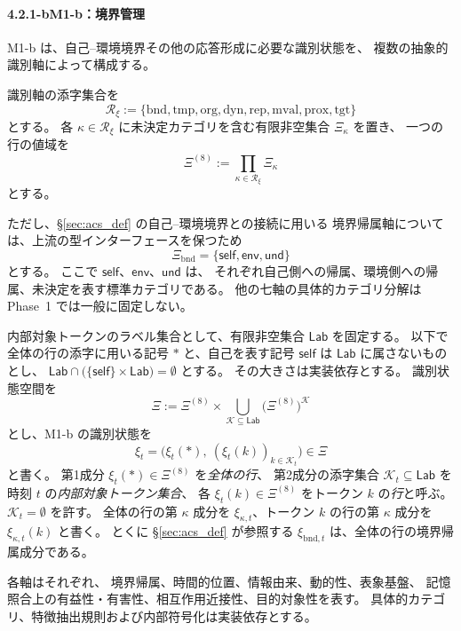 \paragraph*{4.2.1-b\quad M1-b：境界管理}

M1-b は、自己--環境境界その他の応答形成に必要な識別状態を、
複数の抽象的識別軸によって構成する。

\begin{definition}
\label{def:id_vector}
識別軸の添字集合を
\[
  \mathcal R_\xi
  :=
  \{
    \mathrm{bnd},
    \mathrm{tmp},
    \mathrm{org},
    \mathrm{dyn},
    \mathrm{rep},
    \mathrm{mval},
    \mathrm{prox},
    \mathrm{tgt}
  \}
\]
とする。
各 $\kappa\in\mathcal R_\xi$ に未決定カテゴリを含む有限非空集合 $\Xi_\kappa$ を置き、
一つの行の値域を
\[
  \Xi^{(8)}:=\prod_{\kappa\in\mathcal R_\xi}\Xi_\kappa
\]
とする。

ただし、\S\ref{sec:acs_def} の自己--環境境界との接続に用いる
境界帰属軸については、上流の型インターフェースを保つため
\[
  \Xi_{\mathrm{bnd}}
  =
  \{\mathsf{self},\mathsf{env},\mathsf{und}\}
\]
とする。
ここで $\mathsf{self}$、$\mathsf{env}$、$\mathsf{und}$ は、
それぞれ自己側への帰属、環境側への帰属、未決定を表す標準カテゴリである。
他の七軸の具体的カテゴリ分解は Phase~1 では一般に固定しない。

内部対象トークンのラベル集合として、有限非空集合 $\mathsf{Lab}$ を固定する。
以下で全体の行の添字に用いる記号 $\ast$ と、自己を表す記号 $\mathsf{self}$ は $\mathsf{Lab}$ に属さないものとし、
$\mathsf{Lab}\cap\bigl(\{\mathsf{self}\}\times\mathsf{Lab}\bigr)=\emptyset$ とする。
その大きさは実装依存とする。
識別状態空間を
\[
  \Xi
  :=
  \Xi^{(8)}
  \times
  \bigcup_{\mathcal K\subseteq\mathsf{Lab}}
  \bigl(\Xi^{(8)}\bigr)^{\mathcal K}
\]
とし、M1-b の識別状態を
\[
  \xi_t
  =
  \bigl(
    \xi_t(\ast),\
    (\xi_t(k))_{k\in\mathcal K_t}
  \bigr)
  \in\Xi
\]
と書く。
第1成分 $\xi_t(\ast)\in\Xi^{(8)}$ を\emph{全体の行}、
第2成分の添字集合 $\mathcal K_t\subseteq\mathsf{Lab}$ を時刻 $t$ の\emph{内部対象トークン集合}、
各 $\xi_t(k)\in\Xi^{(8)}$ をトークン $k$ の\emph{行}と呼ぶ。
$\mathcal K_t=\emptyset$ を許す。
全体の行の第 $\kappa$ 成分を $\xi_{\kappa,t}$、トークン $k$ の行の第 $\kappa$ 成分を $\xi_{\kappa,t}(k)$ と書く。
とくに \S\ref{sec:acs_def} が参照する $\xi_{\mathrm{bnd},t}$ は、全体の行の境界帰属成分である。

各軸はそれぞれ、
境界帰属、時間的位置、情報由来、動的性、表象基盤、
記憶照合上の有益性・有害性、相互作用近接性、目的対象性を表す。
具体的カテゴリ、特徴抽出規則および内部符号化は実装依存とする。
\end{definition}

